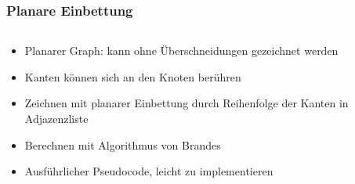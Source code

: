 \documentclass{beamer}
\begin{document}
\begin{frame}
  \frametitle{Planare Einbettung}

\begin{columns}[c]
\begin{column}{5cm}
  \begin{itemize}[<+->]
    \item Planarer Graph: kann ohne Überschneidungen gezeichnet werden
    \item Kanten können sich an den Knoten berühren
    \item Zeichnen mit planarer Einbettung durch Reihenfolge der Kanten in Adjazenzliste
    \item Berechnen mit Algorithmus von Brandes~\cite{brandes-09}
    \item Ausführlicher Pseudocode, leicht zu implementieren


\end{itemize}
\end{column}
\end{columns}
\end{frame}
\end{document}
